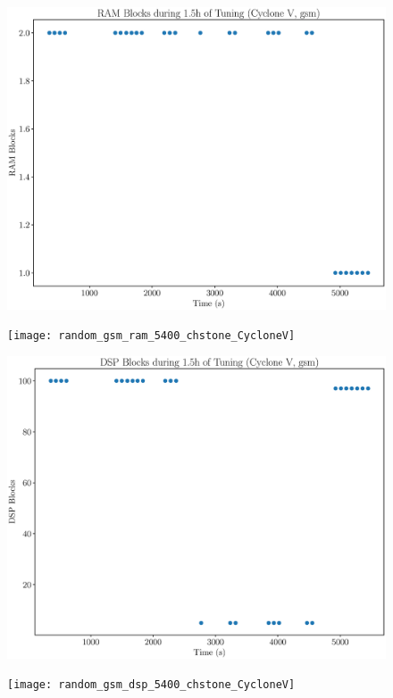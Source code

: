 \documentclass[12pt, a4paper]{article}
\begin{document}
\begin{figure}[htpb]
    \centering
    \noindent
    \begin{minipage}{.48\textwidth}
        \centering
        \includegraphics[scale=.25]{gsm_ram_5400_chstone_CycloneV}
    \end{minipage}%
    \hfill
    \begin{minipage}{.48\textwidth}
        \centering
        \texttt{[image: random\_gsm\_ram\_5400\_chstone\_CycloneV]}
    \end{minipage}%

    \begin{minipage}{.48\textwidth}
        \includegraphics[scale=.25]{gsm_dsp_5400_chstone_CycloneV}
    \end{minipage}%
    \hfill
    \begin{minipage}{.48\textwidth}
        \texttt{[image: random\_gsm\_dsp\_5400\_chstone\_CycloneV]}
    \end{minipage}%


\end{figure}
\end{document}
